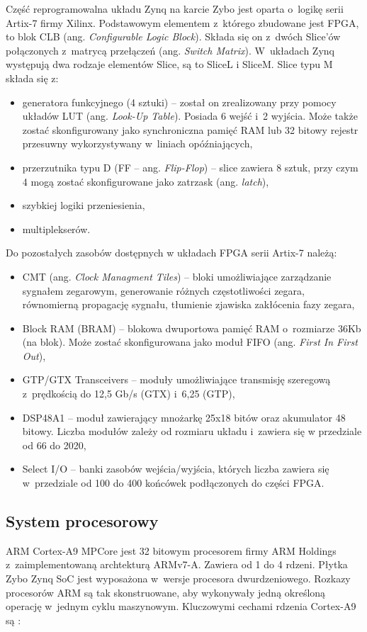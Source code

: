 Część reprogramowalna układu Zynq na karcie Zybo jest oparta o~logikę serii  Artix-7 firmy Xilinx. 
Podstawowym elementem z~którego zbudowane jest FPGA, to blok CLB (ang. \textit{Configurable Logic Block}). 
Składa się on z~dwóch Slice'ów połączonych z~matrycą przełączeń (ang. \textit{Switch Matrix}). 
W~układach Zynq występują dwa rodzaje elementów Slice, są to SliceL i SliceM. 
Slice typu M składa się z:
\begin{itemize}
	\item generatora funkcyjnego (4 sztuki) -- został on zrealizowany przy pomocy układów LUT (ang. \textit{Look-Up Table}). Posiada 6 wejść i~2 wyjścia. Może także zostać skonfigurowany jako synchroniczna pamięć RAM lub 32 bitowy rejestr przesuwny wykorzystywany w~liniach opóźniających,
	\item przerzutnika typu D (FF -- ang. \textit{Flip-Flop}) -- slice zawiera 8 sztuk, przy czym 4 mogą zostać skonfigurowane jako zatrzask (ang. \textit{latch}),
	\item szybkiej logiki przeniesienia,
	\item multiplekserów.
\end{itemize}

Do pozostałych zasobów dostępnych w układach FPGA serii Artix-7 należą:
\begin{itemize}
	\item CMT (ang. \textit{Clock Managment Tiles}) -- bloki umożliwiające zarządzanie sygnałem zegarowym, generowanie różnych częstotliwości zegara, równomierną propagację sygnału, tłumienie zjawiska zakłócenia fazy zegara,
	\item Block RAM (BRAM) -- blokowa dwuportowa pamięć RAM o~rozmiarze 36Kb (na blok). Może zostać skonfigurowana jako moduł FIFO (ang. \textit{First In First Out}), 
	\item GTP/GTX Transceivers -- moduły umożliwiające transmisję szeregową z~prędkością do 12,5 Gb/s (GTX) i~6,25 (GTP),
	\item DSP48A1 -- moduł zawierający mnożarkę 25x18 bitów oraz akumulator 48 bitowy. Liczba modułów zależy od rozmiaru układu i~zawiera się w przedziale od 66 do 2020,
	\item Select I/O -- banki zasobów wejścia/wyjścia, których liczba zawiera się w~przedziale od 100 do 400 końcówek podłączonych do części FPGA.
\end{itemize}

\subsection{System procesorowy}
ARM Cortex-A9 MPCore jest 32 bitowym procesorem firmy ARM Holdings z~zaimplementowaną archtekturą ARMv7-A. 
Zawiera od 1 do 4 rdzeni. 
Płytka Zybo Zynq SoC jest wyposażona w~wersje procesora dwurdzeniowego.
Rozkazy procesorów ARM są tak skonstruowane, aby wykonywały jedną określoną operację w~jednym cyklu maszynowym.
Kluczowymi cechami rdzenia Cortex-A9 są \cite{armCortex}:

